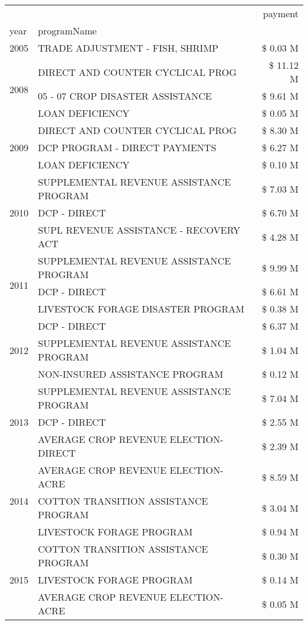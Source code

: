 \begin{tabular}{llr}
\toprule
 &  & payment \\
year & programName &  \\
\midrule
2005 & TRADE ADJUSTMENT - FISH, SHRIMP & \$ 0.03 M \\
\cline{1-3}
\multirow[t]{3}{*}{2008} & DIRECT AND COUNTER CYCLICAL PROG & \$ 11.12 M \\
 & 05 - 07 CROP DISASTER ASSISTANCE & \$ 9.61 M \\
 & LOAN DEFICIENCY & \$ 0.05 M \\
\cline{1-3}
\multirow[t]{3}{*}{2009} & DIRECT AND COUNTER CYCLICAL PROG & \$ 8.30 M \\
 & DCP PROGRAM - DIRECT PAYMENTS & \$ 6.27 M \\
 & LOAN DEFICIENCY & \$ 0.10 M \\
\cline{1-3}
\multirow[t]{3}{*}{2010} & SUPPLEMENTAL REVENUE ASSISTANCE PROGRAM & \$ 7.03 M \\
 & DCP - DIRECT & \$ 6.70 M \\
 & SUPL REVENUE ASSISTANCE - RECOVERY ACT & \$ 4.28 M \\
\cline{1-3}
\multirow[t]{3}{*}{2011} & SUPPLEMENTAL REVENUE ASSISTANCE PROGRAM & \$ 9.99 M \\
 & DCP - DIRECT & \$ 6.61 M \\
 & LIVESTOCK FORAGE DISASTER PROGRAM & \$ 0.38 M \\
\cline{1-3}
\multirow[t]{3}{*}{2012} & DCP - DIRECT & \$ 6.37 M \\
 & SUPPLEMENTAL REVENUE ASSISTANCE PROGRAM & \$ 1.04 M \\
 & NON-INSURED ASSISTANCE PROGRAM & \$ 0.12 M \\
\cline{1-3}
\multirow[t]{3}{*}{2013} & SUPPLEMENTAL REVENUE ASSISTANCE PROGRAM & \$ 7.04 M \\
 & DCP - DIRECT & \$ 2.55 M \\
 & AVERAGE CROP REVENUE ELECTION-DIRECT & \$ 2.39 M \\
\cline{1-3}
\multirow[t]{3}{*}{2014} & AVERAGE CROP REVENUE ELECTION-ACRE & \$ 8.59 M \\
 & COTTON TRANSITION ASSISTANCE PROGRAM & \$ 3.04 M \\
 & LIVESTOCK FORAGE PROGRAM & \$ 0.94 M \\
\cline{1-3}
\multirow[t]{3}{*}{2015} & COTTON TRANSITION ASSISTANCE PROGRAM & \$ 0.30 M \\
 & LIVESTOCK FORAGE PROGRAM & \$ 0.14 M \\
 & AVERAGE CROP REVENUE ELECTION-ACRE & \$ 0.05 M \\

\end{tabular}
